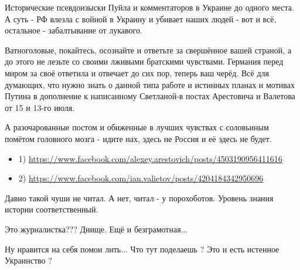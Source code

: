 \begin{itemize}
 

Исторические псевдоизыски Пуйла и комментаторов в Украине до одного места. А
суть - РФ влезла с войной в Украину и убивает наших людей - вот и всё,
остальное - забалтывание от лукавого. 

Ватноголовые, покайтесь, осознайте и ответьте за свершённое вашей страной, а до
этого не лезьте со своими лживыми братскими чувствами. Германия перед миром за
своё ответила и отвечает до сих пор, теперь ваш черёд. Всё для думающих, что
нужно знать о данной типа работе и истинных планах и мотивах Путина в
дополнение к написанному Светланой-в постах Арестовича и Валетова от 15 и 13-го
июля. 

А разочарованные постом и обиженные в лучших чувствах с соловьиным помётом
головного мозга - идите нах, здесь не Россия и её здесь не будет. 

\begin{itemize}
  \item 1) \url{https://www.facebook.com/alexey.arestovich/posts/4503190956411616} 
  \item 2) \url{https://www.facebook.com/ian.valietov/posts/4204184342950696}
\end{itemize}

 
Давно такой чуши не читал. А нет, читал - у порохоботов. Уровень знания истории соответственный.

 
Это журналистка??? Днище. Ещё и безграмотная...

 
Ну нравится на себя помои лить... Что тут поделаешь ? Это и есть истенное Украинство ?


\end{itemize}

